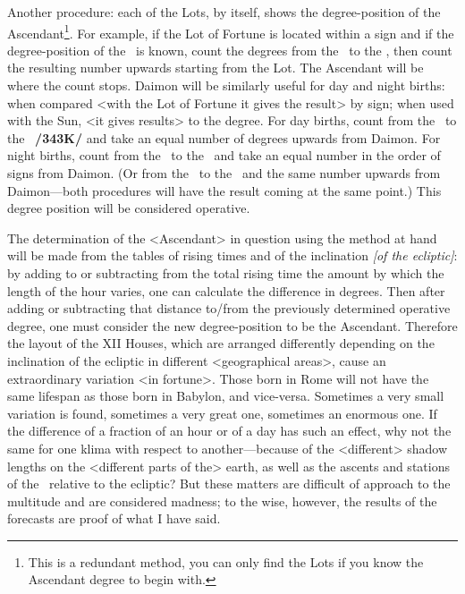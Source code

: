 Another procedure: each of the Lots, by itself, shows the degree-position of the Ascendant\footnote{This is a redundant method, you can only find the Lots if you know the Ascendant degree to begin with.}. For example, if the Lot of Fortune is located within a sign and if the degree-position of the \Moon\, is known, count the degrees from the \Moon\, to the \Sun, then count the resulting number upwards starting from the Lot. The Ascendant will be where the count stops. Daimon will be similarly useful for day and night births: when compared <with the Lot of Fortune it gives the result> by sign; when used with the Sun, <it gives results> to the degree. For day births, count from the \Sun\, to the \Moon\, \textbf{/343K/} and take an equal number of degrees upwards from Daimon. For night births, count from the \Moon\, to the \Sun\, and take an equal number in the order of signs from Daimon. (Or from the \Sun\, to the \Moon\, and the same number upwards from Daimon—both procedures will have the result coming at the same point.) This degree position will be considered operative.

The determination of the <Ascendant> in question using the method at hand will be made from the tables of rising times and of the inclination \textit{[of the ecliptic]}: by adding to or subtracting from the total rising time the amount by which the length of the hour varies, one can calculate the difference in degrees. Then after adding or subtracting that distance to/from the previously determined operative degree, one must consider the new degree-position to be the Ascendant. Therefore the layout of the XII Houses, which are arranged differently depending on the inclination of the ecliptic in different <geographical areas>, cause an extraordinary variation <in fortune>. Those born in Rome will not have the same lifespan as those born in Babylon, and vice-versa. Sometimes a very small variation is found, sometimes a very great one, sometimes an
enormous one. If the difference of a fraction of an hour or of a day has such an effect, why not the same for one klima with respect to another—because of the <different> shadow lengths on the <different parts of the> earth, as well as the ascents and stations of the \Sun\, relative to the ecliptic? But these matters are difficult of
approach to the multitude and are considered madness; to the wise, however, the results of the forecasts are proof of what I have said.


